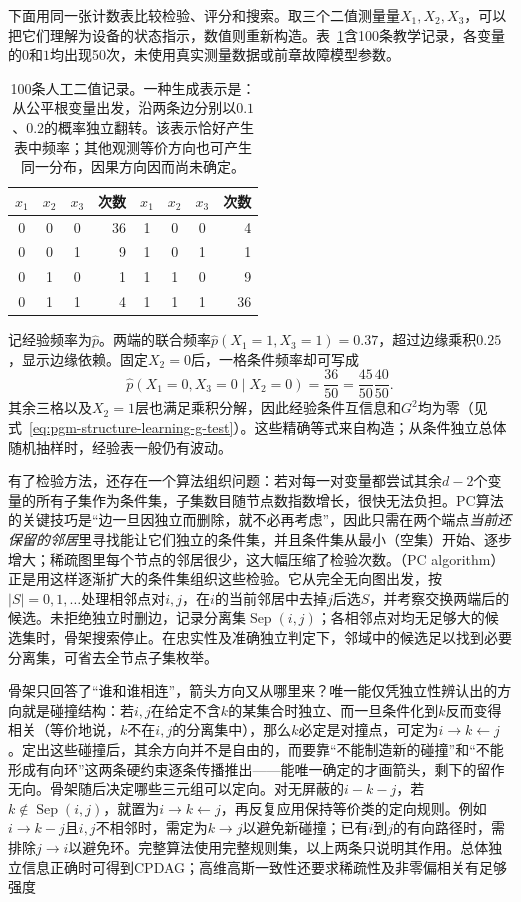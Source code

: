 下面用同一张计数表比较检验、评分和搜索。取三个二值测量量$X_1,X_2,X_3$，可以把它们理解为设备的状态指示，数值则重新构造。表~\ref{tab:pgm-structure-learning-counts}含100条教学记录，各变量的$0$和$1$均出现50次，未使用真实测量数据或前章故障模型参数。

\begin{table}[htbp]
  \centering
  \begin{tabular}{ccc r@{\qquad}ccc r}
    \toprule
    $x_1$ & $x_2$ & $x_3$ & 次数 & $x_1$ & $x_2$ & $x_3$ & 次数 \\
    \midrule
    0 & 0 & 0 & 36 & 1 & 0 & 0 & 4 \\
    0 & 0 & 1 & 9  & 1 & 0 & 1 & 1 \\
    0 & 1 & 0 & 1  & 1 & 1 & 0 & 9 \\
    0 & 1 & 1 & 4  & 1 & 1 & 1 & 36 \\
    \bottomrule
  \end{tabular}
  \caption{100条人工二值记录。一种生成表示是：从公平根变量出发，沿两条边分别以$0.1$、$0.2$的概率独立翻转。该表示恰好产生表中频率；其他观测等价方向也可产生同一分布，因果方向因而尚未确定。}
  \label{tab:pgm-structure-learning-counts}
\end{table}

记经验频率为$\widehat p$。两端的联合频率$\widehat p(X_1=1,X_3=1)=0.37$，超过边缘乘积$0.25$，显示边缘依赖。固定$X_2=0$后，一格条件频率却可写成
\[
  \widehat p(X_1=0,X_3=0\mid X_2=0)
  =\frac{36}{50}=\frac{45}{50}\frac{40}{50}.
\]
其余三格以及$X_2=1$层也满足乘积分解，因此经验条件互信息和$G^2$均为零（见式~\eqref{eq:pgm-structure-learning-g-test}）。这些精确等式来自构造；从条件独立总体随机抽样时，经验表一般仍有波动。

有了检验方法，还存在一个算法组织问题：若对每一对变量都尝试其余$d-2$个变量的所有子集作为条件集，子集数目随节点数指数增长，很快无法负担。PC算法的关键技巧是“边一旦因独立而删除，就不必再考虑”，因此只需在两个端点\emph{当前还保留的邻居}里寻找能让它们独立的条件集，并且条件集从最小（空集）开始、逐步增大；稀疏图里每个节点的邻居很少，这大幅压缩了检验次数。（PC algorithm）正是用这样逐渐扩大的条件集组织这些检验。它从完全无向图出发，按$|S|=0,1,\ldots$处理相邻点对$i,j$，在$i$的当前邻居中去掉$j$后选$S$，并考察交换两端后的候选。未拒绝独立时删边，记录分离集$\operatorname{Sep}(i,j)$；各相邻点对均无足够大的候选集时，骨架搜索停止。在忠实性及准确独立判定下，邻域中的候选足以找到必要分离集，可省去全节点子集枚举。

骨架只回答了“谁和谁相连”，箭头方向又从哪里来？唯一能仅凭独立性辨认出的方向就是碰撞结构：若$i,j$在给定不含$k$的某集合时独立、而一旦条件化到$k$反而变得相关（等价地说，$k$不在$i,j$的分离集中），那么$k$必定是对撞点，可定为$i\to k\leftarrow j$。定出这些碰撞后，其余方向并不是自由的，而要靠“不能制造新的碰撞”和“不能形成有向环”这两条硬约束逐条传播推出——能唯一确定的才画箭头，剩下的留作无向。骨架随后决定哪些三元组可以定向。对无屏蔽的$i-k-j$，若$k\notin\operatorname{Sep}(i,j)$，就置为$i\to k\leftarrow j$，再反复应用保持等价类的定向规则。例如$i\to k-j$且$i,j$不相邻时，需定为$k\to j$以避免新碰撞；已有$i$到$j$的有向路径时，需排除$j\to i$以避免环。完整算法使用完整规则集，以上两条只说明其作用。总体独立信息正确时可得到CPDAG；高维高斯一致性还要求稀疏性及非零偏相关有足够强度

